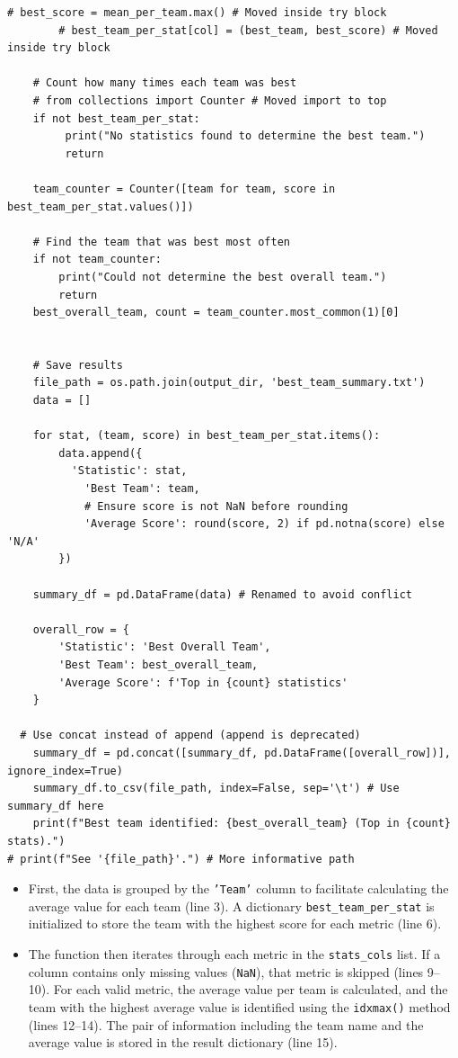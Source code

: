 \documentclass[12pt]{report}
\begin{document}
{{\begin{lstlisting}
# best_score = mean_per_team.max() # Moved inside try block
        # best_team_per_stat[col] = (best_team, best_score) # Moved inside try block

    # Count how many times each team was best
    # from collections import Counter # Moved import to top
    if not best_team_per_stat:
         print("No statistics found to determine the best team.")
         return

    team_counter = Counter([team for team, score in best_team_per_stat.values()])

    # Find the team that was best most often
    if not team_counter:
        print("Could not determine the best overall team.")
        return
    best_overall_team, count = team_counter.most_common(1)[0]


    # Save results
    file_path = os.path.join(output_dir, 'best_team_summary.txt')
    data = []

    for stat, (team, score) in best_team_per_stat.items():
        data.append({
          'Statistic': stat,
            'Best Team': team,
            # Ensure score is not NaN before rounding
            'Average Score': round(score, 2) if pd.notna(score) else 'N/A'
        })

    summary_df = pd.DataFrame(data) # Renamed to avoid conflict

    overall_row = {
        'Statistic': 'Best Overall Team',
        'Best Team': best_overall_team,
        'Average Score': f'Top in {count} statistics'
    }

  # Use concat instead of append (append is deprecated)
    summary_df = pd.concat([summary_df, pd.DataFrame([overall_row])], ignore_index=True)
    summary_df.to_csv(file_path, index=False, sep='\t') # Use summary_df here
    print(f"Best team identified: {best_overall_team} (Top in {count} stats).")
# print(f"See '{file_path}'.") # More informative path
\end{lstlisting}
\begin{itemize}
    \item First, the data is grouped by the \texttt{'Team'} column to facilitate calculating the average value for each team (line 3). A dictionary \texttt{best\_team\_per\_stat} is initialized to store the team with the highest score for each metric (line 6).

    \item The function then iterates through each metric in the \texttt{stats\_cols} list. If a column contains only missing values (\texttt{NaN}), that metric is skipped (lines 9--10). For each valid metric, the average value per team is calculated, and the team with the highest average value is identified using the \texttt{idxmax()} method (lines 12--14). The pair of information including the team name and the average value is stored in the result dictionary (line 15).


\end{itemize}}}
\end{document}
